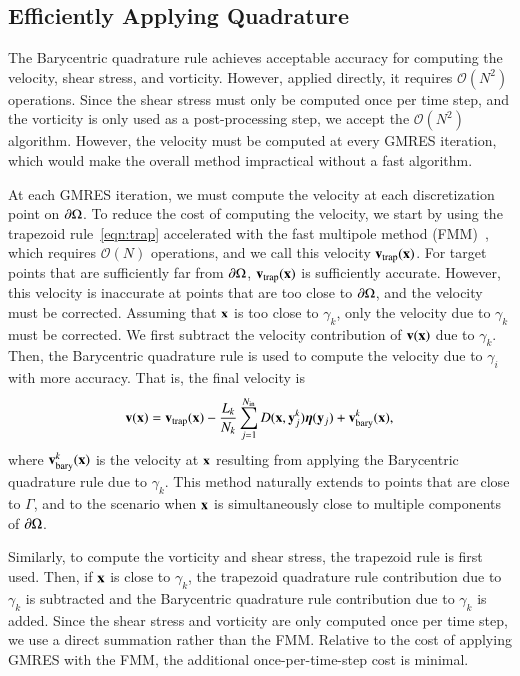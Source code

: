 \documentclass[preprint, 10pt]{elsarticle}
\begin{document}
\subsection{Efficiently Applying Quadrature}
\label{s:fmm}
The Barycentric quadrature rule achieves acceptable accuracy for
computing the velocity, shear stress, and vorticity.  However, applied
directly, it requires $\mathcal{O}(N^2)$ operations.  Since the shear
stress must only be computed once per time step, and the vorticity is
only used as a post-processing step, we accept the $\mathcal{O}(N^2)$
algorithm.  However, the velocity must be computed at every GMRES
iteration, which would make the overall method impractical without a
fast algorithm.

At each GMRES iteration, we must compute the velocity at each
discretization point on ${\partial}\Omega$.  To reduce the cost of computing
the velocity, we start by using the trapezoid rule~\eqref{eqn:trap}
accelerated with the fast multipole method (FMM)~\cite{gre-rok1987},
which requires $\mathcal{O}(N)$ operations, and we call this velocity
${\mathbf{v}}_{\mathrm{trap}}({\mathbf{x}})$.  For target points that are sufficiently far from
${\partial}\Omega$, ${\mathbf{v}}_{\mathrm{trap}}({\mathbf{x}})$ is sufficiently accurate.  However, this
velocity is inaccurate at points that are too close to ${\partial}\Omega$, and
the velocity must be corrected.  Assuming that ${\mathbf{x}}$ is too close to
$\gamma_k$, only the velocity due to $\gamma_k$ must be corrected. We
first subtract the velocity contribution of ${\mathbf{v}}({\mathbf{x}})$ due to
$\gamma_k$.  Then, the Barycentric quadrature rule is used to compute
the velocity due to $\gamma_i$ with more accuracy.  That is, the final
velocity is
\begin{align}
  {\mathbf{v}}({\mathbf{x}}) = {\mathbf{v}}_{\mathrm{trap}}({\mathbf{x}}) - \frac{L_k}{N_k} \sum_{j=1}^{N_{\mathrm{in}}} 
    D({\mathbf{x}},{\mathbf{y}}^k_j) {\boldsymbol\eta}({\mathbf{y}}_j) + {\mathbf{v}}^k_{\mathrm{bary}}({\mathbf{x}}),
\end{align}
where ${\mathbf{v}}^k_{\mathrm{bary}}({\mathbf{x}})$ is the velocity at ${\mathbf{x}}$ resulting from
applying the Barycentric quadrature rule due to $\gamma_k$.  This method
naturally extends to points that are close to $\Gamma$, and to the
scenario when ${\mathbf{x}}$ is simultaneously close to multiple components of
${\partial}\Omega$.

Similarly, to compute the vorticity and shear stress, the trapezoid rule
is first used.  Then, if ${\mathbf{x}}$ is close to $\gamma_k$, the trapezoid
quadrature rule contribution due to $\gamma_k$ is subtracted and the
Barycentric quadrature rule contribution due to $\gamma_k$ is added.
Since the shear stress and vorticity are only computed once per time
step, we use a direct summation rather than the FMM.  Relative to the
cost of applying GMRES with the FMM, the additional once-per-time-step
cost is minimal.
\end{document}
